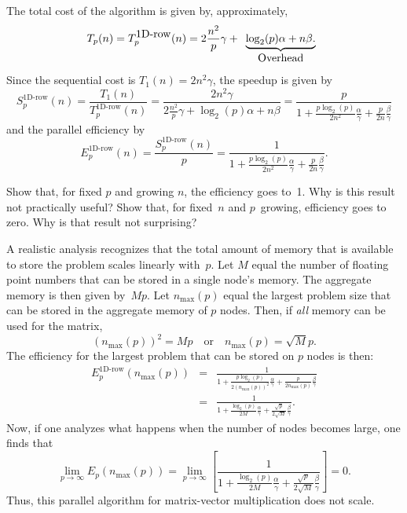 The total cost of the algorithm is given by, approximately,
\[
T_p(n) = T_p^{\mbox{1D-row}}(n) = 
2 \frac{n^2}{p} \gamma + 
\begin{array}[t]{c}
\underbrace{\log_2(p) \alpha + n \beta.}
\\
\mbox{Overhead}
\end{array}
\]
Since the sequential cost is $ T_1(n) = 2 n^2 \gamma $, the speedup is given by
\[
S_p^{\mbox{1D-row}}(n) = 
\frac{T_1(n)}
{T_p^{\mbox{1D-row}}(n)} = 
\frac{2 n^2 \gamma}
{ 2 \frac{n^2}{p} \gamma + 
\log_2(p) \alpha + n \beta}
= 
\frac{p}
{ 1 + \frac{p \log_2(p)}{2 n^2} \frac{\alpha}{\gamma} 
+ \frac{p}{2 n} \frac{\beta}{\gamma} }
\]
and the parallel efficiency by
\[
E_p^{\mbox{1D-row}}(n) = 
\frac{S_p^{\mbox{1D-row}}(n)}{p}
= 
\frac{1}
{ 1 + \frac{p \log_2(p)}{2 n^2} \frac{\alpha}{\gamma} 
+ \frac{p}{2 n} \frac{\beta}{\gamma} }.
\]

\begin{exercise}
  Show that, for fixed $p$ and growing $n$, the efficiency goes
  to~1. Why is this result not practically useful? Show that, for
  fixed~$n$ and $p$~growing, efficiency goes to zero. Why is that
  result not surprising?
\end{exercise}

A realistic analysis recognizes that the total amount of memory that is
available to store the problem scales linearly with~$ p $.  Let $ M $
equal the number of floating point numbers that can be stored in a
single node's memory.  The aggregate memory is then given by~$ M p $.
Let $ n_{\mbox{max}}(p) $ equal the largest problem size that can be
stored in the aggregate memory of $ p $ nodes.  Then, if {\em all}
memory can be used for the matrix,
\[
(n_{\mbox{max}}(p))^2 = M p
\quad
\mbox{or}
\quad
n_{\mbox{max}}(p) = \sqrt{M} {p}.
\]
The efficiency for the largest problem that can be stored on $ p $
nodes is then:
\begin{eqnarray*}
E_p^{\mbox{1D-row}}(n_{\mbox{max}}(p)) &=& 
\frac{1}
{1 + \frac{p \log_2(p)}{2 (n_{\mbox{max}}(p))^2} \frac{\alpha}{\gamma} 
+ \frac{p}{2 n_{\mbox{max}}(p)} \frac{\beta}{\gamma} }
\\
&=&
\frac{1}
{ 1 + \frac{\log_2(p)}{2 M} \frac{\alpha}{\gamma} 
+ \frac{\sqrt{p}}{2 \sqrt{M}} \frac{\beta}{\gamma} }.
\end{eqnarray*}
Now, if one analyzes what happens when the number of nodes
becomes large, one finds that
\[
\lim_{p \rightarrow \infty} E_p( n_{\mbox{max}}(p) ) 
=
\lim_{p \rightarrow \infty}
\left[
\frac{1}
{1 + \frac{\log_2(p)}{2 M} \frac{\alpha}{\gamma} 
+ \frac{\sqrt{p}}{2 \sqrt{M}} \frac{\beta}{\gamma} }
\right]
=
0.
\]
Thus, this parallel algorithm for matrix-vector multiplication
does not scale.

